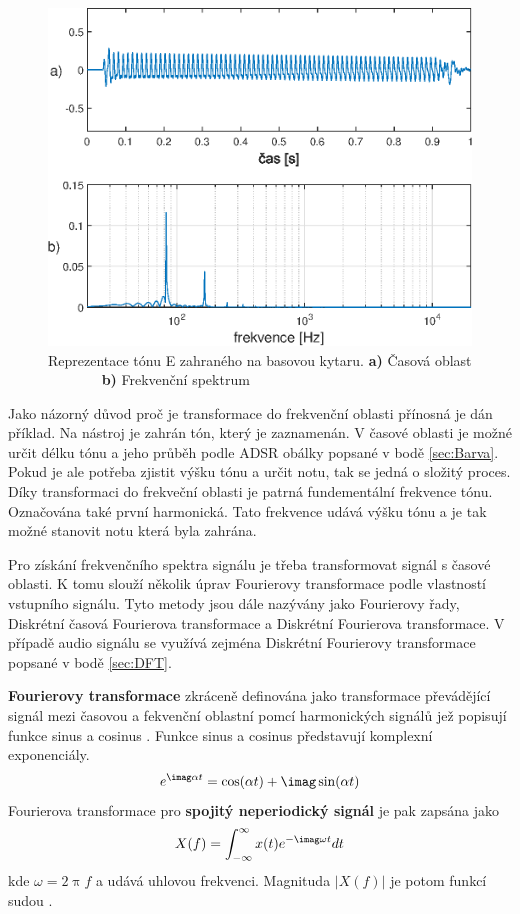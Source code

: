   \begin{figure}[H]
    \centering
        \includegraphics[width = 0.8\linewidth]{obrazky/Bass_tone_spectrum.eps}
    \caption{Reprezentace tónu E zahraného na basovou kytaru. \textbf{a)} Časová oblast ~ ~ ~ ~ ~\textbf{b)} Frekvenční spektrum}
    \label{fig:Bass_tone}
\end{figure}
  
  Jako názorný důvod proč je transformace do frekvenční oblasti přínosná je dán příklad. Na nástroj je zahrán tón, který je zaznamenán. 
  V časové oblasti je možné určit délku tónu a jeho průběh podle ADSR obálky popsané v bodě \ref{sec:Barva}.
  Pokud je ale potřeba zjistit výšku tónu a určit notu, tak se jedná o složitý proces.
  Díky transformaci do frekveční oblasti je patrná fundementální frekvence tónu.
  Označována také první harmonická.
  Tato frekvence udává výšku tónu a je tak možné stanovit notu která byla zahrána.

  Pro získání frekvenčního spektra signálu je třeba transformovat signál s časové oblasti. K tomu slouží několik úprav Fourierovy transformace podle vlastností vstupního signálu. Tyto metody jsou dále nazývány jako Fourierovy řady, Diskrétní časová Fourierova transformace a Diskrétní Fourierova transformace. V případě audio signálu se využívá zejména Diskrétní Fourierovy transformace popsané v bodě \ref{sec:DFT}.

  \textbf{Fourierovy transformace} zkráceně definována jako transformace převádějící signál mezi časovou a fekvenční oblastní pomcí harmonických signálů jež popisují funkce sinus a cosinus \cite{bracewell1978fourier}. Funkce sinus a cosinus představují komplexní exponenciály.
  \begin{equation}
    e^{\imag \alpha t} = \cos(\alpha t) + \imag \sin(\alpha t)
  \end{equation}
  Fourierova transformace pro \textbf{ spojitý neperiodický signál} je pak zapsána jako
  \begin{equation}
    X(f) = \int_{-\infty}^{\infty} x(t) e^{-\imag\omega t} dt
  \end{equation}
  kde $\omega = 2\uppi f$ a udává uhlovou frekvenci. Magnituda $|X(f)|$ je potom funkcí sudou \cite{sneddon1995fourier}.

